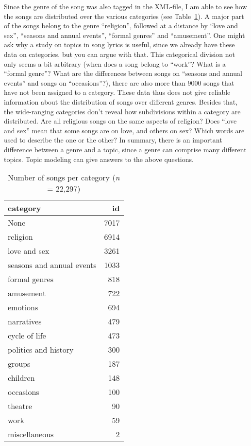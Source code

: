 Since the genre of the song was also tagged in the XML-file, I am able to see how the songs are distributed over the various categories (see Table~\ref{table:SongsCat}). A major part of the songs belong to the genre \enquote{religion}, followed at a distance by \enquote{love and sex},  \enquote{seasons and annual events}, \enquote{formal genres} and \enquote{amusement}. One might ask why a study on topics in song lyrics is useful, since we already have these data on categories, but you can argue with that. This categorical division not only seems a bit arbitrary (when does a song belong to \enquote{work}? What is a \enquote{formal genre}? What are the differences between songs on \enquote{seasons and annual events} and songs on \enquote{occasions}?), there are also more than 9000 songs that have not been assigned to a category. These data thus does not give reliable information about the distribution of songs over different genres. Besides that, the wide-ranging categories don't reveal how subdivisions within a category are distributed. Are all religious songs on the same aspects of religion? Does \enquote{love and sex} mean that some songs are on love, and others on sex? Which words are used to describe the one or the other? In summary, there is an important difference between a genre and a topic, since a genre can comprise many different topics. Topic modeling can give answers to the above questions.

\begin{table}
	\centering
	\begin{tabular}{lr}
		\toprule
		category                  & id        \\
		\midrule
		None                  &  7017 \\
		religion                     &   6914 \\
		love and sex              &   3261 \\
		seasons and annual events &   1033 \\
		formal genres                  &   818 \\
		amusement             &   722 \\
		emotions                &    694 \\
		narratives      &    479 \\
		cycle of life                &    473 \\
		politics and history             &    300 \\
		groups                    &    187 \\
		children                  &    148 \\
		occasions                 &    100 \\
		theatre                   &     90 \\
		work                      &     59 \\
		miscellaneous             &      2 \\
		\bottomrule
	\end{tabular}
	\caption{Number of songs per category (\textit{n} = 22,297)}
	\label{table:SongsCat}
\end{table}

